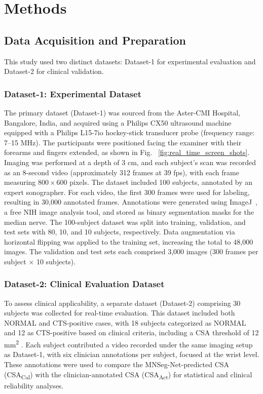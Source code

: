 \section{Methods}

\subsection{Data Acquisition and Preparation}
This study used two distinct datasets: Dataset-1 for experimental evaluation and Dataset-2 for clinical validation.

\subsubsection{Dataset-1: Experimental Dataset}  
The primary dataset (Dataset-1) was sourced from the Aster-CMI Hospital, Bangalore, India, and acquired using a Philips CX50 ultrasound machine equipped with a Philips L15-7io hockey-stick transducer probe (frequency range: 7–15 MHz). The participants were positioned facing the examiner with their forearms and fingers extended, as shown in Fig. ~\ref{fig:real_time_screen_shots}. Imaging was performed at a depth of 3 cm, and each subject’s scan was recorded as an 8-second video (approximately 312 frames at 39 fps), with each frame measuring $800 \times 600$ pixels. The dataset included 100 subjects, annotated by an expert sonographer. For each video, the first 300 frames were used for labeling, resulting in 30,000 annotated frames. Annotations were generated using ImageJ~\cite{ferreira2012imagej}, a free NIH image analysis tool, and stored as binary segmentation masks for the median nerve. The 100-subject dataset was split into training, validation, and test sets with 80, 10, and 10 subjects, respectively. Data augmentation via horizontal flipping was applied to the training set, increasing the total to 48,000 images. The validation and test sets each comprised 3,000 images (300 frames per subject $\times$ 10 subjects).


\subsubsection{Dataset-2: Clinical Evaluation Dataset}  
To assess clinical applicability, a separate dataset (Dataset-2) comprising 30 subjects was collected for real-time evaluation. This dataset included both NORMAL and CTS-positive cases, with 18 subjects categorized as NORMAL and 12 as CTS-positive based on clinical criteria, including a CSA threshold of 12 mm\textsuperscript{2} \cite{ghasemi2017determination,nkrumah2020ultrasonography,falsetti2022novel}. Each subject contributed a video recorded under the same imaging setup as Dataset-1, with six clinician annotations per subject, focused at the wrist level. These annotations were used to compare the MNSeg-Net-predicted CSA (CSA\textsubscript{Cal}) with the clinician-annotated CSA (CSA\textsubscript{Act}) for statistical and clinical reliability analyses.


